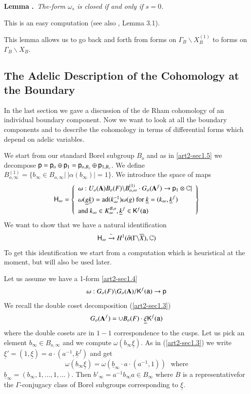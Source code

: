 \medskip
\noindent
{\bf Lemma .\label{art2-lem1.5.2}}~{\em The-form $\omega_{s}$ is closed if and only if $s=0$.}
\smallskip

This is an easy computation (see also \cite{art2-key8}, Lemma 3.1).

This lemma allows us to go back and forth from forms on $\Gamma_{B}\backslash X^{(1)}_{B}$ to forms on $\Gamma_{B}\backslash X_{B}$.

\subsection{The Adelic Description of the Cohomology at the Boundary}\label{art2-sec1.6}
In the last section we gave a discussion of the de Rham cohomology of an individual boundary component. Now we want to look at all the boundary components and to describe the cohomology in terms of differential forms which depend on adelic variables.

We start from our standard Borel subgroup $B_{o}$ and as in \ref{art2-sec1.5} we decompose $\mathsf{p}=\mathsf{p}_{o}\oplus \mathsf{p}_{1}=\mathsf{p}_{o,B_{o}}\oplus \mathsf{p}_{1,B_{o}}$. We define $B_{o,\infty}^{(1)}=\{b_{\infty}\in B_{o,\infty}|~|\alpha(b_{\infty})|=1\}$. We introduce the space of maps
$$
\mathsf{H}_{\infty}=
\left\{
\begin{array}{l}
\omega:U_{o}(\mathbf{A})B_{o}(F)\backslash B_{o,\infty}^{(1)}\cdot G_{o}(\mathbf{A}^{f})\to \mathsf{p}_{1}\otimes \mathbb{C}|\\[4pt]
\omega(\underline{g}\underline{k})=\operatorname{ad}(k^{-1}_{\infty})\omega(g)\text{~ for~ }\underline{k}=(k_{\infty},\underline{k}^{f})\\[4pt]
\text{and~ } k_{\infty}\in K^{B,o}_{\infty},\underline{k}^{f}\in \mathsf{K}^{f}(\mathsf{a})
\end{array}
\right\}
$$
We want to show that we have a natural identification
$$
\mathsf{H}_{\infty}\xrightarrow{\sim}H^{1}(\partial(\Gamma\backslash \overline{X}),\mathbb{C})
$$
To get this identification we start from a computation which is heuristical at the moment, but will also be used later.

Let us assume we have a 1-form \ref{art2-sec1.4}
$$
\omega:G_{o}(F)\backslash G_{o}(\mathbf{A})/\mathsf{K}^{f}(\mathsf{a})\to\mathsf{p}
$$
We recall the double coset decomposition (\ref{art2-sec1.3})
$$
G_{o}(\mathbf{A}^{f})=\cup B_{o}(F)\cdot \underline{\xi}\mathsf{K}^{f}(\mathsf{a})
$$
where the double cosets are in $1-1$ correspondence to the cusps. Let us pick an element $b_{\infty}\in B_{o,\infty}$ and we compute $\omega(b_{\infty}\underline{\xi})$. As in (\ref{art2-sec1.3}) we write $\underline{\xi}'=(1,\underline{\xi})=a\cdot (a^{-1},\underline{k}^{f})$ and get
$$
\omega(b_{\infty}\underline{\xi})=\omega(\underline{b}_{\infty}\cdot a\cdot (a^{-1},1))\text{~ where}
$$
$\underline{b}_{\infty}=(b_{\infty},1,\ldots,1,\ldots)$. Then $b'_{\infty}=a^{-1}b_{\infty}a\in B_{\infty}$ where $B$ is a representative\pageoriginale for the $\Gamma$-conjugacy class of Borel subgroups corresponding to $\underline{\xi}$.

